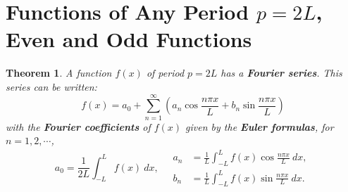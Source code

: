 \documentclass[12pt,openany]{book}
\newtheorem{theorem}{Theorem}[chapter]
\theoremstyle{definition}
\begin{document}
	\section{Functions of Any Period $p = 2L$, Even and Odd Functions}
	\begin{tcolorbox}[colframe=thmcolor, title={\color{white}\bf Fourier Series of a Periodic Function of Period \(2L\))}]
		\begin{theorem}
			A function \(f(x)\) of period \(p = 2L\) has a \textbf{Fourier series}. This series can be written:
			\[
			f(x) = a_0 + \sum_{n=1}^{\infty} \left( a_n \cos \frac{n\pi x}{L} + b_n \sin \frac{n\pi x}{L} \right)
			\]
			with the \textbf{Fourier coefficients} of \(f(x)\) given by the \textbf{Euler formulas}, for $n=1,2,\cdots$,
			\[
			a_0 = \frac{1}{2L} \int_{-L}^{L} f(x) \ dx,\quad
			\begin{aligned}
				a_n &= \frac{1}{L} \int_{-L}^{L} f(x) \cos \frac{n\pi x}{L} \ dx,\\
				b_n &= \frac{1}{L} \int_{-L}^{L} f(x) \sin \frac{n\pi x}{L} \ dx.
			\end{aligned}
			\]
		\end{theorem}
	\end{tcolorbox}
\end{document}
